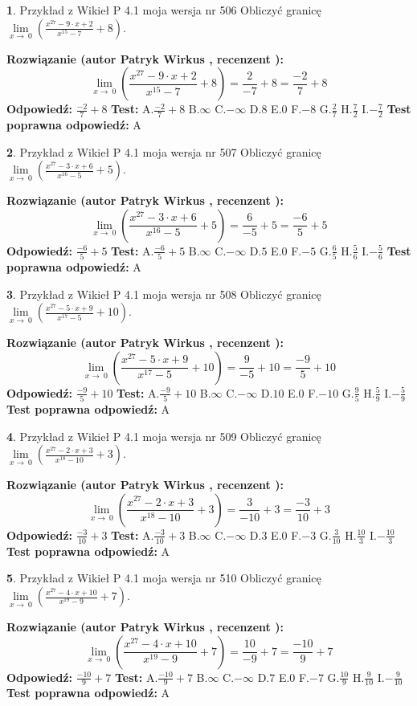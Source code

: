 \documentclass[12pt, a4paper]{article}
\theoremstyle{definition} %
\newtheorem{zad}{}
\newcommand{\zadStart}[1]{\begin{zad}#1\newline}
\newcommand{\zadStop}{\end{zad}}
\newcommand{\rozwStart}[2]{\noindent \textbf{Rozwiązanie (autor #1 , recenzent #2): }\newline}
\newcommand{\rozwStop}{\newline}
\newcommand{\odpStart}{\noindent \textbf{Odpowiedź:}\newline}
\newcommand{\odpStop}{\newline}
\newcommand{\testStart}{\noindent \textbf{Test:}\newline}
\newcommand{\testStop}{\newline}
\newcommand{\kluczStart}{\noindent \textbf{Test poprawna odpowiedź:}\newline}
\newcommand{\kluczStop}{\newline}
\begin{document}
\zadStart{Przykład z Wikieł P 4.1 moja wersja nr 506}
Obliczyć granicę $\lim\limits_{x\to\ 0}(\frac{x^{27}-9 \cdot x +2}{x^{15}-7}+8)$.
\zadStop
\rozwStart{Patryk Wirkus}{}
$$\lim\limits_{x\to\ 0}(\frac{x^{27}-9 \cdot x +2}{x^{15}-7}+8)=\frac{2}{-7}+8=\frac{-2}{7}+8$$
\rozwStop
\odpStart
$\frac{-2}{7}+8$
\odpStop
\testStart
A.$\frac{-2}{7}+8$
B.$\infty$
C.$-\infty$
D.$8$
E.$0$
F.$-8$
G.$\frac{2}{7}$
H.$\frac{7}{2}$
I.$-\frac{7}{2}$
\testStop
\kluczStart
A
\kluczStop



\zadStart{Przykład z Wikieł P 4.1 moja wersja nr 507}
Obliczyć granicę $\lim\limits_{x\to\ 0}(\frac{x^{27}-3 \cdot x +6}{x^{16}-5}+5)$.
\zadStop
\rozwStart{Patryk Wirkus}{}
$$\lim\limits_{x\to\ 0}(\frac{x^{27}-3 \cdot x +6}{x^{16}-5}+5)=\frac{6}{-5}+5=\frac{-6}{5}+5$$
\rozwStop
\odpStart
$\frac{-6}{5}+5$
\odpStop
\testStart
A.$\frac{-6}{5}+5$
B.$\infty$
C.$-\infty$
D.$5$
E.$0$
F.$-5$
G.$\frac{6}{5}$
H.$\frac{5}{6}$
I.$-\frac{5}{6}$
\testStop
\kluczStart
A
\kluczStop



\zadStart{Przykład z Wikieł P 4.1 moja wersja nr 508}
Obliczyć granicę $\lim\limits_{x\to\ 0}(\frac{x^{27}-5 \cdot x +9}{x^{17}-5}+10)$.
\zadStop
\rozwStart{Patryk Wirkus}{}
$$\lim\limits_{x\to\ 0}(\frac{x^{27}-5 \cdot x +9}{x^{17}-5}+10)=\frac{9}{-5}+10=\frac{-9}{5}+10$$
\rozwStop
\odpStart
$\frac{-9}{5}+10$
\odpStop
\testStart
A.$\frac{-9}{5}+10$
B.$\infty$
C.$-\infty$
D.$10$
E.$0$
F.$-10$
G.$\frac{9}{5}$
H.$\frac{5}{9}$
I.$-\frac{5}{9}$
\testStop
\kluczStart
A
\kluczStop



\zadStart{Przykład z Wikieł P 4.1 moja wersja nr 509}
Obliczyć granicę $\lim\limits_{x\to\ 0}(\frac{x^{27}-2 \cdot x +3}{x^{18}-10}+3)$.
\zadStop
\rozwStart{Patryk Wirkus}{}
$$\lim\limits_{x\to\ 0}(\frac{x^{27}-2 \cdot x +3}{x^{18}-10}+3)=\frac{3}{-10}+3=\frac{-3}{10}+3$$
\rozwStop
\odpStart
$\frac{-3}{10}+3$
\odpStop
\testStart
A.$\frac{-3}{10}+3$
B.$\infty$
C.$-\infty$
D.$3$
E.$0$
F.$-3$
G.$\frac{3}{10}$
H.$\frac{10}{3}$
I.$-\frac{10}{3}$
\testStop
\kluczStart
A
\kluczStop



\zadStart{Przykład z Wikieł P 4.1 moja wersja nr 510}
Obliczyć granicę $\lim\limits_{x\to\ 0}(\frac{x^{27}-4 \cdot x +10}{x^{19}-9}+7)$.
\zadStop
\rozwStart{Patryk Wirkus}{}
$$\lim\limits_{x\to\ 0}(\frac{x^{27}-4 \cdot x +10}{x^{19}-9}+7)=\frac{10}{-9}+7=\frac{-10}{9}+7$$
\rozwStop
\odpStart
$\frac{-10}{9}+7$
\odpStop
\testStart
A.$\frac{-10}{9}+7$
B.$\infty$
C.$-\infty$
D.$7$
E.$0$
F.$-7$
G.$\frac{10}{9}$
H.$\frac{9}{10}$
I.$-\frac{9}{10}$
\testStop
\kluczStart
A
\kluczStop
\end{document}
